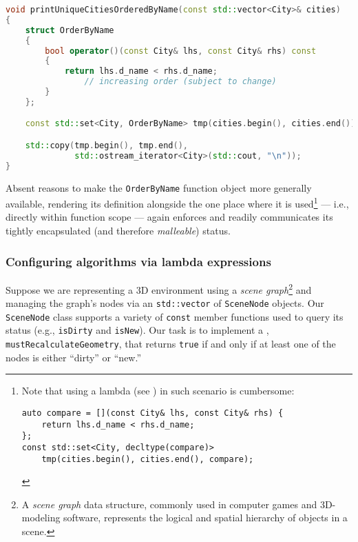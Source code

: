 \begin{lstlisting}[language=C++]
void printUniqueCitiesOrderedByName(const std::vector<City>& cities)
{
    struct OrderByName
    {
        bool operator()(const City& lhs, const City& rhs) const
        {
            return lhs.d_name < rhs.d_name;
                // increasing order (subject to change)
        }
    };

    const std::set<City, OrderByName> tmp(cities.begin(), cities.end());

    std::copy(tmp.begin(), tmp.end(),
              std::ostream_iterator<City>(std::cout, "\n"));
}
\end{lstlisting}

\noindent Absent reasons to make the \lstinline!OrderByName!
function object more generally available, rendering its definition
alongside the one place where it is used{\cprotect\footnote{Note that using a lambda (see ) in such scenario is cumbersome:
\begin{lstlisting}[basicstyle=\ttfamily\footnotesize]
auto compare = [](const City& lhs, const City& rhs) {
    return lhs.d_name < rhs.d_name;
};
const std::set<City, decltype(compare)>
    tmp(cities.begin(), cities.end(), compare);
\end{lstlisting}}} --- i.e., directly within
function scope --- again enforces and readily communicates its tightly
encapsulated (and therefore \emph{malleable}) status.

\subsubsection[Configuring algorithms via lambda expressions]{Configuring algorithms via lambda expressions}\label{configuring-algorithms-via-lambda-expressions}

Suppose we are representing a 3D environment using a \emph{scene
graph}{\cprotect\footnote{A \emph{scene graph} data structure, commonly
used in computer games and 3D-modeling software, represents the
  logical and spatial hierarchy of objects in a scene.}} and managing
the graph's nodes via an \lstinline!std::vector! of \lstinline!SceneNode!
objects. Our \lstinline!SceneNode! class supports a variety of
\lstinline!const! member functions used to query its status (e.g.,
\lstinline!isDirty! and \lstinline!isNew!). Our task is to implement a
, \lstinline!mustRecalculateGeometry!, that
returns \lstinline!true! if and only if at least one of the nodes is either
``dirty'' or ``new.''

